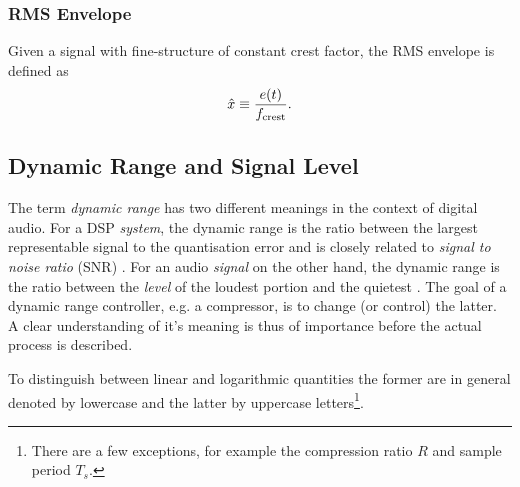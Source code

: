 \documentclass[../main2.tex]{subfiles}
\begin{document}
\subsubsection{RMS Envelope}
Given a signal with fine-structure of constant crest factor, the RMS envelope is defined as
\begin{align}
\hat{x} \equiv \frac{e(t)}{f_\text{crest}}.
\end{align}
\subsection{Dynamic Range and Signal Level}
The term \emph{dynamic range} has two different meanings in the context of digital audio. For a DSP \emph{system}, the dynamic range is the ratio between the largest representable signal to the quantisation error and is closely related to \emph{signal to noise ratio} (SNR)  \cite{wilson1993filter}. For an audio \emph{signal} on the other hand, the dynamic range is the ratio between the \emph{level} of the loudest portion and the quietest \cite{davis1989sound}. The goal of a dynamic range controller, e.g. a compressor, is to change (or control) the latter. A clear understanding of it's meaning is thus of importance before the actual process is described. 

To distinguish between linear and logarithmic quantities the former are in general denoted by lowercase and the latter by uppercase letters\footnote{There are a few exceptions, for example the compression ratio $R$ and sample period $T_s$.}.
\end{document}
